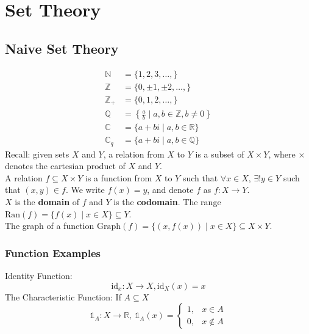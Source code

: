 \documentclass[10pt]{extarticle}
\title{}
\author{Avinash Iyer}
\date{}
\begin{document}
\tableofcontents
\pagebreak
\section{Set Theory}%
\subsection{Naive Set Theory}%
    \begin{align*}
      \mathbb{N} &= \{1,2,3,\dots,\}\\
      \mathbb{Z} &= \{0,\pm1,\pm2,\dots,\} \\
      \mathbb{Z}_+ &= \{0,1,2,\dots,\}\\
      \mathbb{Q} &= \left\{\frac{a}{b} \mid a,b\in\mathbb{Z},b\neq 0\right\}\\
      \mathbb{C} &= \{a+bi \mid a,b\in \mathbb{R}\}\\
      \mathbb{C}_q &= \{a+bi \mid a,b\in \mathbb{Q}\}
    \end{align*}
    Recall: given sets $X$ and $Y$, a relation from $X$ to $Y$ is a subset of $X\times Y$, where $\times$ denotes the cartesian product of $X$ and $Y$.\\

    A relation $f\subseteq X\times Y$ is a function from $X$ to $Y$ such that $\forall x\in X$, $\exists!y\in Y$ such that $(x,y) \in f$. We write $f(x) = y$, and denote $f$ as $f:X\rightarrow Y$.\\

    $X$ is the \textbf{domain} of $f$ and $Y$ is the \textbf{codomain}. The range $\text{Ran}(f) = \{f(x)\mid x\in X\}\subseteq Y$. \\

    The graph of a function $\text{Graph}(f) = \{(x,f(x))\mid x\in X\} \subseteq X\times Y$.
    \subsubsection{Function Examples}%
    Identity Function:
      \[\text{id}_x: X\rightarrow X, \text{id}_X(x) = x\]
      The Characteristic Function: If $A\subseteq X$
      \[\mathbb{1}_A: X\rightarrow \mathbb{R}, ~\mathbb{1}_A(x) = \begin{cases}
        1,&x\in A\\
        0,&x\notin A
      \end{cases}\]
\end{document}

